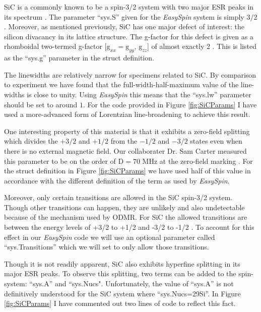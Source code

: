 \documentclass[oneside]{BYUPhys}
\begin{document}
SiC is a commonly known to be a spin-3/2 system with two major ESR peaks in its spectrum \cite{RefWorks:doc:5892964ee4b0499fa95c5108}. The parameter ``sys.S'' given for the \textit{EasySpin} system is simply $3/2$. Moreover, as mentioned previously, SiC has one major defect of interest: the silicon divacancy \cite{RefWorks:doc:58929800e4b0499fa95c51a1} \cite{RefWorks:doc:589297a9e4b0d4c09201f736} in its lattice structure. The g-factor for this defect is given as a rhomboidal two-termed g-factor [$\text{g}_{xx}=\text{g}_{yy}$, $\text{g}_{zz}$] of almost exactly 2 \cite{RefWorks:doc:5892964ee4b0499fa95c5108}. This is listed as the ``sys.g'' parameter in the struct definition.

The linewidths are relatively narrow for specimens related to SiC. By comparison to experiment we have found that the full-width-half-maximum value of the line-widths is close to unity. Using \textit{EasySpin} this means that the ``sys.lw'' parameter should be set to around $1$. For the code provided in Figure \ref{fig:SiCParams} I have used a more-advanced form of Lorentzian line-broadening to achieve this result.

One interesting property of this material is that it exhibits a zero-field splitting which divides the $+3/2$ and $+1/2$ from the $-1/2$ and $-3/2$ states even when there is no external magnetic field. Our collaborater Dr. Sam Carter measured this parameter to be on the order of D$=70$ MHz at the zero-field marking \cite{RefWorks:doc:5892964ee4b0499fa95c5108}. For the struct definition in Figure \ref{fig:SiCParams} we have used half of this value in accordance with the different definition of the term as used by \textit{EasySpin}.

Moreover, only certain transitions are allowed in the SiC spin-3/2 system. Though other transitions can happen, they are unlikely and also undetectable because of the mechanism used by ODMR. For SiC the allowed transitions are between the energy levels of +3/2 to +1/2 and -3/2 to -1/2 \cite{RefWorks:doc:5892964ee4b0499fa95c5108}. To account for this effect in our \textit{EasySpin} code we will use an optional parameter called ``sys.Transitions'' which we will set to only allow those transitions.

Though it is not readily apparent, SiC also exhibits hyperfine splitting in its major ESR peaks. To observe this splitting, two terms can be added to the spin-system: ``sys.A'' and ``sys.Nucs". Unfortunately, the value of ``sys.A'' is not definitively understood for the SiC system where ``sys.Nucs=29Si''. In Figure \ref{fig:SiCParams} I have commented out two lines of code to reflect this fact.
 
\end{document}
